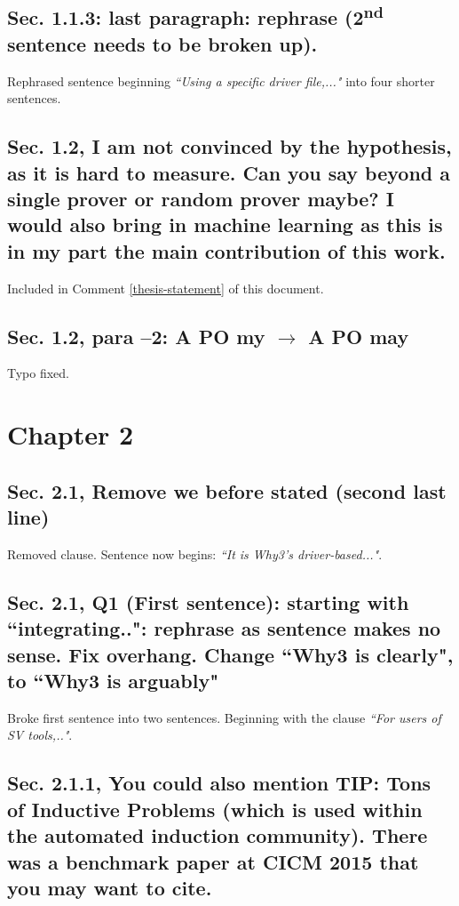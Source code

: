 \documentclass[]{article}
\newcommand{\ts}{\textsuperscript}
\begin{document}
\subsection{Sec. 1.1.3: last paragraph: rephrase (2\ts{nd} sentence needs to be broken up).}

Rephrased sentence beginning \emph{``Using a specific driver file,..."} into four shorter sentences.

\subsection{Sec. 1.2, I am not convinced by the hypothesis, as it is hard to measure. Can you say beyond a single prover or random prover maybe? I would also bring in machine learning as this is in my part the main contribution of this work.}

Included in Comment \ref{thesis-statement} of this document.

\subsection{Sec. 1.2, para –2: A PO my $\rightarrow$ A PO may}

Typo fixed.

\section{Chapter 2}

\subsection{Sec. 2.1, Remove we before stated (second last line)}

Removed clause. Sentence now begins: \emph{``It is \textsf{Why3}'s driver-based..."}.

\subsection{Sec. 2.1, Q1 (First sentence): starting with ``integrating..": rephrase as sentence makes no sense. Fix overhang. Change ``Why3 is clearly", to ``Why3 is arguably"}

Broke first sentence into two sentences. Beginning with the clause \emph{``For users of SV tools,.."}.

\subsection{Sec. 2.1.1, You could also mention TIP: Tons of Inductive Problems (which is used within the automated induction community). There was a benchmark paper at CICM 2015 that you may want to cite.}
\end{document}

